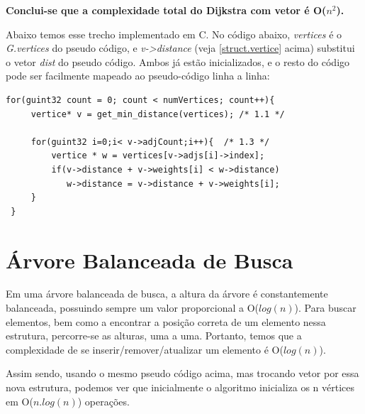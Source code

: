 \documentclass[
	12pt,				%
	oneside,			%
	a4paper,			%
	english,			%
	french,				%
	spanish,			%
	brazil,				%
	]{abntex2}
\begin{document}

\textbf{Conclui-se que a complexidade total do Dijkstra com vetor é O($n^2$).}

Abaixo temos esse trecho implementado em C. No código abaixo, \emph{vertices} é o \emph{G.vertices} do pseudo código, e \emph{v->distance} (veja \ref{struct.vertice} acima) substitui o vetor \emph{dist} do pseudo código. Ambos já estão inicializados, e o resto do código pode ser facilmente mapeado ao pseudo-código linha a linha:

\begin{lstlisting}[caption=Corpo do algortimo Dijkstra com uso do vetor, label=dijkstra.vetor]
 for(guint32 count = 0; count < numVertices; count++){
     vertice* v = get_min_distance(vertices); /* 1.1 */
      
     for(guint32 i=0;i< v->adjCount;i++){  /* 1.3 */
         vertice * w = vertices[v->adjs[i]->index];
         if(v->distance + v->weights[i] < w->distance)
            w->distance = v->distance + v->weights[i]; 
     }
 }
\end{lstlisting}


\section{Árvore Balanceada de Busca}
Em uma árvore balanceada de busca, a altura da árvore é constantemente balanceada, possuindo sempre um valor proporcional a \textsf{O($log(n)$)}. Para buscar elementos, bem como a encontrar a posição correta de um elemento nessa estrutura, percorre-se as alturas, uma a uma. Portanto, temos que a complexidade de se inserir/remover/atualizar um elemento é \textsf{O($log(n)$)}.

Assim sendo, usando o mesmo pseudo código acima, mas trocando vetor por essa nova estrutura, podemos ver que inicialmente o algoritmo inicializa os n vértices em \textsf{O($n.log(n)$)} operações.
\end{document}
